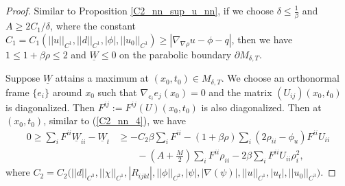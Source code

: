 \documentclass[12pt]{amsart}
\theoremstyle{definition}
\theoremstyle{remark}
\numberwithin{equation}{section}
\begin{document}
\begin{proof}
	Similar to Proposition \ref{C2_nn_sup_u_nn}, if we choose $\delta \leq \frac{1}{\beta}$ and $A \geq 2C_1 / \delta$, where the constant $C_1 =  C_1 \left( || u ||_{C^1}, || d||_{C^1}, |\phi|, || u_0||_{C^1} \right) \geq |\nabla_{\nabla \rho} u - \phi - q|$, then we have $1 \leq 1 + \beta \rho \leq 2$ and $\underline{W} \leq 0$ on the parabolic boundary $\partial M_{\delta, T}$.
	
	
	Suppose $\underline{W}$ attains a maximum at $(x_0, t_0) \in M_{\delta, T}$. 
	We choose an orthonormal frame $\{e_i\}$ around $x_0$ such that $\nabla_{e_i} e_j (x_0) = 0$ and the matrix $\left( U_{ij} \right)(x_0, t_0)$ is diagonalized. Then $F^{ij} := F^{ij}(U)(x_0, t_0)$ is also diagonalized. Then at $(x_0, t_0)$, similar to (\ref{C2_nn_4}), we have
	\begin{equation}\label{C2_nn_24}
	\begin{aligned}
	0 \geq \sum_i F^{ii} \underline{W}_{ii} - \underline{W}_t
	&\geq - C_2 \beta \sum_i F^{ii} - (1 + \beta\rho) \sum_i ( 2\rho_{ii} - \phi_{u}) F^{ii} U_{ii}  \\
	&\qquad - (A + \frac{M}{2}) \sum_i F^{ii} \rho_{ii} - 2 \beta \sum_i F^{ii} U_{ii} \rho_i^2 ,
	\end{aligned}
	\end{equation}
	where $C_2 = C_2 \big(||d||_{C^3}, ||\chi||_{C^1}, |R_{ijkl}|, ||\phi||_{C^2}, |\psi|, |\nabla(\psi)|, ||u||_{C^1}, |u_t|, ||u_0||_{C^3} \big)$.
	

\end{proof}
\end{document}
